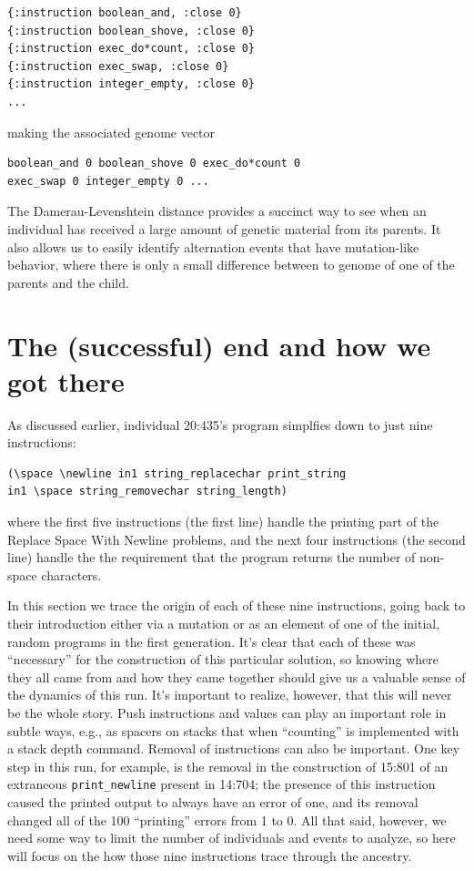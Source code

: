 \documentclass[graybox]{svmult}
\begin{document}
\begin{verbatim}
{:instruction boolean_and, :close 0} 
{:instruction boolean_shove, :close 0} 
{:instruction exec_do*count, :close 0} 
{:instruction exec_swap, :close 0} 
{:instruction integer_empty, :close 0}
...
\end{verbatim}

making the associated genome vector

\begin{verbatim}
boolean_and 0 boolean_shove 0 exec_do*count 0 
exec_swap 0 integer_empty 0 ...
\end{verbatim}

The Damerau-Levenshtein distance provides a succinct way to see when an individual has received a
large amount of genetic material from its parents. It also allows us to easily identify alternation
events that have mutation-like behavior, where there is only a small difference 
between to genome of one of the parents and the child.

\section{The (successful) end and how we got there}
\label{sec:successfulEnd}

As discussed earlier, individual 20:435's program simplfies down to just
nine instructions:
\begin{verbatim}
(\space \newline in1 string_replacechar print_string
in1 \space string_removechar string_length)
\end{verbatim}
where the first five instructions (the first line) handle the printing part
of the Replace Space With Newline problems, and the next four instructions
(the second line) handle the the requirement that the program returns the
number of non-space characters.

In this section we trace the origin of each of these nine instructions,
going back to their introduction either via a mutation or as an element 
of one of the initial, random programs in the first generation. It's clear
that each of these was ``necessary'' for the construction of this particular
solution, so knowing where they all came from and how they came together
should give us a valuable sense of the dynamics of this run. 
It's important to realize, however, that this will
never be the whole story. Push instructions and values can play an 
important role in subtle ways, e.g., as spacers on stacks that when
``counting'' is implemented with a stack depth command. Removal of
instructions can also be important. One key step in this run, for example, 
is the removal in the construction of 15:801 of an extraneous \texttt{print\_newline} present in 14:704; the presence of this
instruction caused the printed output to always have an error of one,
and its removal changed all of the 100 ``printing'' errors
from 1 to 0. All that said, however, we need some way to limit the number
of individuals and events to analyze, so here will focus on the how those
nine instructions trace through the ancestry.
\end{document}
